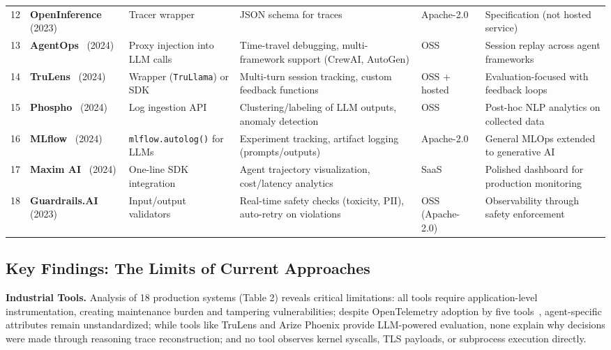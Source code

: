 \documentclass[sigplan,screen,9pt]{acmart}
\begin{document}
\begin{table*}[t]
\begin{tabular}{p{0.5cm} p{2.2cm} p{2.3cm} p{2.8cm} p{1.8cm} p{2.5cm}}
12 & \textbf{OpenInference}~\cite{openinference} (2023) & Tracer wrapper & JSON schema for traces & Apache-2.0 & Specification (not hosted service) \\
13 & \textbf{AgentOps}~\cite{agentops-tool} (2024) & Proxy injection into LLM calls & Time-travel debugging, multi-framework support (CrewAI, AutoGen) & OSS & Session replay across agent frameworks \\
14 & \textbf{TruLens}~\cite{trulens} (2024) & Wrapper (\texttt{TruLlama}) or SDK & Multi-turn session tracking, custom feedback functions & OSS + hosted & Evaluation-focused with feedback loops \\
15 & \textbf{Phospho}~\cite{phospho} (2024) & Log ingestion API & Clustering/labeling of LLM outputs, anomaly detection & OSS & Post-hoc NLP analytics on collected data \\
16 & \textbf{MLflow}~\cite{mlflow-genai} (2024) & \texttt{mlflow.autolog()} for LLMs & Experiment tracking, artifact logging (prompts/outputs) & Apache-2.0 & General MLOps extended to generative AI \\
17 & \textbf{Maxim AI}~\cite{maxim-ai} (2024) & One-line SDK integration & Agent trajectory visualization, cost/latency analytics & SaaS & Polished dashboard for production monitoring \\
18 & \textbf{Guardrails.AI}~\cite{guardrails-ai} (2023) & Input/output validators & Real-time safety checks (toxicity, PII), auto-retry on violations & OSS (Apache-2.0) & Observability through safety enforcement \\
\bottomrule
\end{tabular}
\end{table*}

\subsection{Key Findings: The Limits of Current Approaches}

\textbf{Industrial Tools.} Analysis of 18 production systems (Table 2) reveals critical limitations: all tools require application-level instrumentation, creating maintenance burden and tampering vulnerabilities; despite OpenTelemetry adoption by five tools~\cite{Liu2025OTel}, agent-specific attributes remain unstandardized; while tools like TruLens and Arize Phoenix provide LLM-powered evaluation, none explain why decisions were made through reasoning trace reconstruction; and no tool observes kernel syscalls, TLS payloads, or subprocess execution directly.
\end{document}
